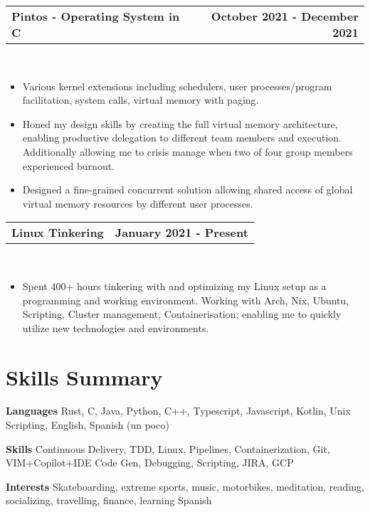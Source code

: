 \documentclass[letterpaper,oneside,10.8pt]{article}
\makeatletter
\newcommand{\titleAndDate}[2]{
  \small{
  \vspace{-1pt}
    \begin{tabular*}{1\textwidth}{l@{\extracolsep{\fill}}r}
      \textbf{#1} & \textbf{#2} \\
    \end{tabular*}\vspace{-1pt} \\
  }
}
\newcommand{\normalText}[1]{
  \small{
    {#1}
  }\vspace{-1pt}\\
}
\makeatother
\begin{document}
\vspace{3pt}
    
\titleAndDate{Pintos - Operating System in C}{October 2021 - December 2021}
\begin{itemize}[leftmargin=10pt]
    \item\normalText{Various kernel extensions including schedulers, user processes/program facilitation, system calls, virtual memory with paging. }
    \item\normalText{Honed my design skills by creating the full virtual memory architecture, enabling productive delegation to different team members and execution. Additionally allowing me to crisis manage when two of four group members experienced burnout. }
    \item\normalText{Designed a fine-grained concurrent solution allowing shared access of global virtual memory resources by different user processes. }
\end{itemize}
    
\vspace{3pt}

\titleAndDate{Linux Tinkering}{January 2021 - Present}
\begin{itemize}[leftmargin=10pt]
    \item\normalText{Spent 400+ hours tinkering with and optimizing my Linux setup as a programming and working environment. Working with Arch, Nix, Ubuntu, Scripting, Cluster management, Containerisation; enabling me to quickly utilize new technologies and environments. }
\end{itemize}

\section{Skills Summary}

\normalText{\textbf{Languages} Rust, C, Java, Python, C++, Typescript, Javascript, Kotlin, Unix Scripting, English, Spanish (un poco)}
\vspace{3pt}
\normalText{\textbf{Skills} Continuous Delivery, TDD, Linux, Pipelines, Containerization, Git, VIM+Copilot+IDE Code Gen, Debugging, Scripting, JIRA, GCP}
\vspace{3pt}
\normalText{\textbf{Interests} Skateboarding, extreme sports, music, 
 motorbikes, meditation, reading, socializing, travelling, finance, learning Spanish}

\end{document}
